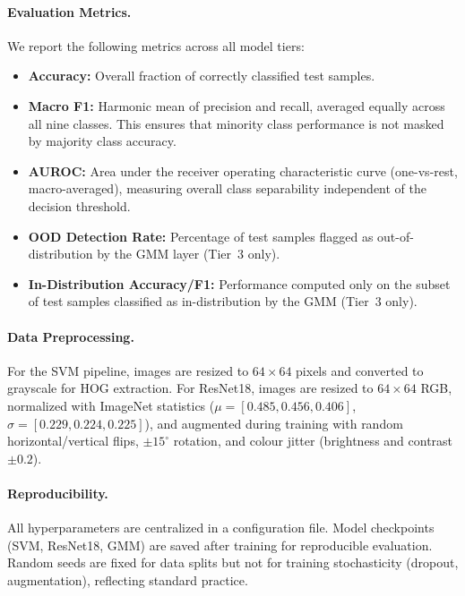 \documentclass{article}
\begin{document}
\paragraph{Evaluation Metrics.}
We report the following metrics across all model tiers:
\begin{itemize}
    \item \textbf{Accuracy:} Overall fraction of correctly classified test samples.
    \item \textbf{Macro F1:} Harmonic mean of precision and recall, averaged equally across all nine classes. This ensures that minority class performance is not masked by majority class accuracy.
    \item \textbf{AUROC:} Area under the receiver operating characteristic curve (one-vs-rest, macro-averaged), measuring overall class separability independent of the decision threshold.
    \item \textbf{OOD Detection Rate:} Percentage of test samples flagged as out-of-distribution by the GMM layer (Tier~3 only).
    \item \textbf{In-Distribution Accuracy/F1:} Performance computed only on the subset of test samples classified as in-distribution by the GMM (Tier~3 only).
\end{itemize}

\paragraph{Data Preprocessing.}
For the SVM pipeline, images are resized to $64 \times 64$ pixels and converted to grayscale for HOG extraction. For ResNet18, images are resized to $64 \times 64$ RGB, normalized with ImageNet statistics ($\mu = [0.485, 0.456, 0.406]$, $\sigma = [0.229, 0.224, 0.225]$), and augmented during training with random horizontal/vertical flips, $\pm 15^{\circ}$ rotation, and colour jitter (brightness and contrast $\pm 0.2$).

\paragraph{Reproducibility.}
All hyperparameters are centralized in a configuration file. Model checkpoints (SVM, ResNet18, GMM) are saved after training for reproducible evaluation. Random seeds are fixed for data splits but not for training stochasticity (dropout, augmentation), reflecting standard practice.

\end{document}
